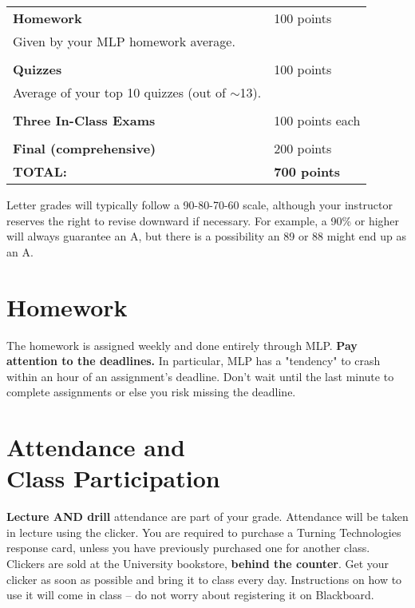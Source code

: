 \documentclass[margin,line,pifont,palatino,courier]{res}
\begin{document}
\begin{resume}
\begin{center}
\begin{supertabular}{@{}p{0.6\textwidth} l}
	{\bf Homework} & 100 points \\
		\hspace{5pt}Given by your MLP homework average. & \\
		 & \\
{\bf Quizzes} & 100 points \\
	\hspace{5pt} Average of your top 10 quizzes (out of $\sim$13). & \\
 & \\
 {\bf Three In-Class Exams} & 100 points each \\
 & \\
{\bf Final (comprehensive)} & 200 points \\
{\bf TOTAL:} & {\bf 700 points} \\
\end{supertabular}
\end{center}

Letter grades will typically follow a 90-80-70-60 scale, although your instructor reserves the right to revise downward if necessary.  For example, a 90\% or higher will always guarantee an A, but there is a possibility an 89 or 88 might end up as an A.

\section{\sc Homework} The homework is assigned weekly and done entirely through MLP.  {\bf Pay attention to the deadlines.}  In particular, MLP has a "tendency" to crash within an hour of an assignment's deadline.  Don't wait until the last minute to complete assignments or else you risk missing the deadline.

\section{\sc Attendance and \\ Class Participation} {\bf Lecture AND drill} attendance are part of your grade.  Attendance will be taken in lecture using the clicker.  You are required to purchase a Turning Technologies response card, unless you have previously purchased one for another class.  Clickers are sold at the University bookstore, {\bf behind the counter}.  Get your clicker as soon as possible and bring it to class every day.  Instructions on how to use it will come in class -- do not worry about registering it on Blackboard.


\end{resume}
\end{document}
